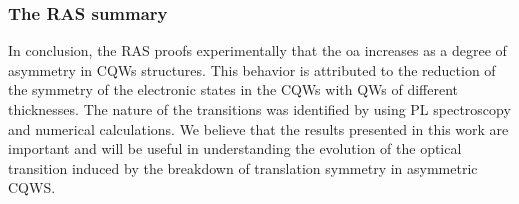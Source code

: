 \subsubsection{The RAS summary}
\label{subsubsec:chapter-3-ras-conclusions}
\vspace{-10mm}
In conclusion, the RAS proofs experimentally that the \gls{oa} increases as a degree of asymmetry in \gls{CQWs} structures. This behavior is attributed to the reduction of the symmetry of the electronic states in the \gls{CQWs} with \gls{QW}s of different thicknesses. The nature of the transitions was identified by
using PL spectroscopy and numerical calculations. We believe
that the results presented in this work are important and will
be useful in understanding the evolution of the optical transition induced by the breakdown of translation symmetry in asymmetric CQWS.











